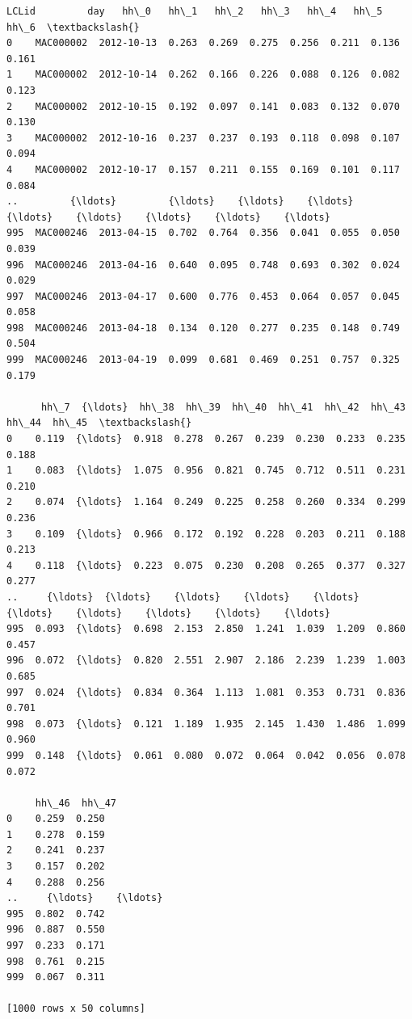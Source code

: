 \documentclass[11pt]{article}
\makeatletter
\newcommand{\boxspacing}{\kern\kvtcb@left@rule\kern\kvtcb@boxsep}
\newcommand{\prompt}[4]{
        {\ttfamily\llap{{\color{#2}[#3]:\hspace{3pt}#4}}\vspace{-\baselineskip}}
    }
\makeatother
\begin{document}
            \begin{tcolorbox}[breakable, size=fbox, boxrule=.5pt, pad at break*=1mm, opacityfill=0]
\prompt{Out}{outcolor}{57}{\boxspacing}
\begin{Verbatim}[commandchars=\\\{\}]
         LCLid         day   hh\_0   hh\_1   hh\_2   hh\_3   hh\_4   hh\_5   hh\_6  \textbackslash{}
0    MAC000002  2012-10-13  0.263  0.269  0.275  0.256  0.211  0.136  0.161
1    MAC000002  2012-10-14  0.262  0.166  0.226  0.088  0.126  0.082  0.123
2    MAC000002  2012-10-15  0.192  0.097  0.141  0.083  0.132  0.070  0.130
3    MAC000002  2012-10-16  0.237  0.237  0.193  0.118  0.098  0.107  0.094
4    MAC000002  2012-10-17  0.157  0.211  0.155  0.169  0.101  0.117  0.084
..         {\ldots}         {\ldots}    {\ldots}    {\ldots}    {\ldots}    {\ldots}    {\ldots}    {\ldots}    {\ldots}
995  MAC000246  2013-04-15  0.702  0.764  0.356  0.041  0.055  0.050  0.039
996  MAC000246  2013-04-16  0.640  0.095  0.748  0.693  0.302  0.024  0.029
997  MAC000246  2013-04-17  0.600  0.776  0.453  0.064  0.057  0.045  0.058
998  MAC000246  2013-04-18  0.134  0.120  0.277  0.235  0.148  0.749  0.504
999  MAC000246  2013-04-19  0.099  0.681  0.469  0.251  0.757  0.325  0.179

      hh\_7  {\ldots}  hh\_38  hh\_39  hh\_40  hh\_41  hh\_42  hh\_43  hh\_44  hh\_45  \textbackslash{}
0    0.119  {\ldots}  0.918  0.278  0.267  0.239  0.230  0.233  0.235  0.188
1    0.083  {\ldots}  1.075  0.956  0.821  0.745  0.712  0.511  0.231  0.210
2    0.074  {\ldots}  1.164  0.249  0.225  0.258  0.260  0.334  0.299  0.236
3    0.109  {\ldots}  0.966  0.172  0.192  0.228  0.203  0.211  0.188  0.213
4    0.118  {\ldots}  0.223  0.075  0.230  0.208  0.265  0.377  0.327  0.277
..     {\ldots}  {\ldots}    {\ldots}    {\ldots}    {\ldots}    {\ldots}    {\ldots}    {\ldots}    {\ldots}    {\ldots}
995  0.093  {\ldots}  0.698  2.153  2.850  1.241  1.039  1.209  0.860  0.457
996  0.072  {\ldots}  0.820  2.551  2.907  2.186  2.239  1.239  1.003  0.685
997  0.024  {\ldots}  0.834  0.364  1.113  1.081  0.353  0.731  0.836  0.701
998  0.073  {\ldots}  0.121  1.189  1.935  2.145  1.430  1.486  1.099  0.960
999  0.148  {\ldots}  0.061  0.080  0.072  0.064  0.042  0.056  0.078  0.072

     hh\_46  hh\_47
0    0.259  0.250
1    0.278  0.159
2    0.241  0.237
3    0.157  0.202
4    0.288  0.256
..     {\ldots}    {\ldots}
995  0.802  0.742
996  0.887  0.550
997  0.233  0.171
998  0.761  0.215
999  0.067  0.311

[1000 rows x 50 columns]
\end{Verbatim}
\end{tcolorbox}
        
\end{document}
